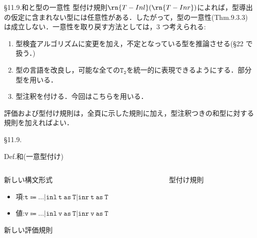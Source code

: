 \documentclass[9pt]{beamer}
\begin{document}
\begin{frame}{\S11.9.和と型の一意性}
型付け規則$\rn{T-Inl}(\rn{T-Inr})$によれば，型導出の仮定に含まれない型には任意性がある．したがって，型の一意性(Thm.9.3.3)は成立しない．一意性を取り戻す方法としては，3 つ考えられる:\begin{enumerate}
\item 型検査アルゴリズムに変更を加え，不定となっている型を推論させる(\S22 で扱う．)
\item 型の言語を改良し，可能な全ての$\mathtt{T_{2}}$を統一的に表現できるようにする．部分型を用いる．
\item 型注釈を付ける．今回はこちらを用いる．
\end{enumerate}
評価および型付け規則は，全頁に示した規則に加え，型注釈つきの和型に対する規則を加えればよい．
\end{frame}
\begin{frame}{\S11.9.}
\begin{alertblock}{Def.和(一意型付け)}
\begin{columns}
\begin{column}{0.5\columnwidth}
新しい構文形式\begin{itemize}
\item 項:$\mathtt{t\Coloneq\ldots|inl\ t\ as\ T|inr\ t\ as\ T}$
\item 値:$\mathtt{v\Coloneq\ldots|inl\ v\ as\ T|inr\ v\ as\ T}$
\end{itemize}
新しい評価規則
\end{column}
\begin{column}{0.5\columnwidth}
型付け規則
\end{column}
\end{columns}
\end{alertblock}
\end{frame}
\end{document}
